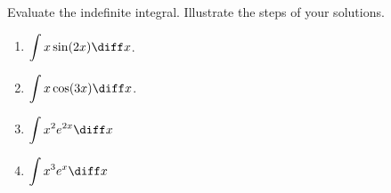 Evaluate the indefinite integral. Illustrate the steps of your solutions.
\begin{multicols}{2}
\begin{enumerate}
\item $\displaystyle \int x \sin (2x)\diff x$.
\item $\displaystyle \int x \cos (3x)\diff x$.
\item $\displaystyle \int x^2 e^{2x}\diff x$
\item $\displaystyle \int x^3 e^x \diff x$
\end{enumerate}
\end{multicols}